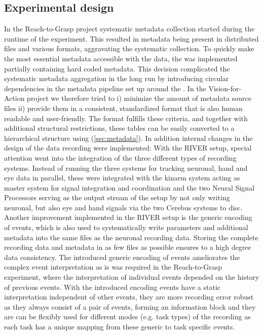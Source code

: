 \subsection{Experimental design}
In the Reach-to-Grasp project systematic metadata collection started during the runtime of the experiment. This resulted in metadata being present in distributed files and various formats, aggravating the systematic collection. To quickly make the most essential metadata accessible with the data, the  was implemented partially containing hard coded metadata. This decision complicated the systematic metadata aggregation in the long run by introducing circular dependencies in the metadata pipeline set up around the .
In the Vision-for-Action project we therefore tried to i) minimize the amount of metadata source files ii) provide them in a consistent, standardized format that is also human readable and user-friendly. The  format fulfills these criteria, and together with additional structural restrictions, these tables can be easily converted to a hierarchical  structure using  (\cref{sec:metadata}).
In addition internal changes in the design of the data recording were implemented: With the RIVER setup, special attention went into the integration of the three different types of recording systems. Instead of running the three systems for tracking neuronal, hand and eye data in parallel, these were integrated with the kinarm system acting as master system for signal integration and coordination and the two Neural Signal Processors serving as the output stream of the setup by not only writing neuronal, but also eye and hand signals via the two Cerebus systems to disc.
Another improvement implemented in the RIVER setup is the generic encoding of events, which is also used to systematically write parameters and additional metadata into the same files as the neuronal recording data. Storing the complete recording data and metadata in as few files as possible ensures to a high degree data consistency. The introduced generic encoding of events ameliorates the complex event interpretation as is was required in the Reach-to-Grasp experiment, where the interpretation of individual events depended on the history of previous events. With the introduced encoding events have a static interpretation independent of other events, they are more recording error robust as they always consist of a pair of events, forming an information block and they are can be flexibly used for different modes (e.g. task types) of the recording as each task has a unique mapping from these generic to task specific events.

